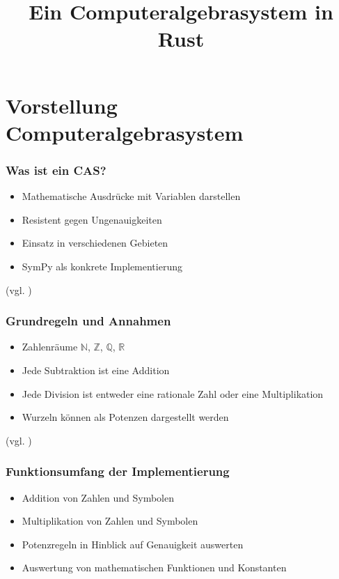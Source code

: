 \documentclass{beamer}
\title{Ein Computeralgebrasystem in Rust}
\begin{document}
\maketitle
{}

\section{Vorstellung Computeralgebrasystem}
\begin{frame}[fragile]
  \frametitle{Was ist ein CAS?}
  \begin{itemize}
    \item Mathematische Ausdrücke mit Variablen darstellen
    \pause
    \item Resistent gegen Ungenauigkeiten
    \pause
    \item Einsatz in verschiedenen Gebieten
    \pause
    \item SymPy als konkrete Implementierung
  \end{itemize}
  {\small (vgl. \cite{FachgruppeDef} \cite[S. 1]{SympyPeerJ})}
\end{frame}

\begin{frame}[fragile]
  \frametitle{Grundregeln und Annahmen}
  \begin{itemize}
    \item Zahlenräume $\mathbb{N}$, $\mathbb{Z}$, $\mathbb{Q}$, $\mathbb{R}$
    \pause
    \item Jede Subtraktion ist eine Addition
    \pause
    \item Jede Division ist entweder eine rationale Zahl oder eine Multiplikation
    \pause
    \item Wurzeln können als Potenzen dargestellt werden
  \end{itemize}
  {\small (vgl. \cite[S. 23 ff.]{Geddes2007} \cite[S. 2]{Tan2000})}
\end{frame}

\begin{frame}[fragile]
  \frametitle{Funktionsumfang der Implementierung}
  \begin{itemize}
    \item Addition von Zahlen und Symbolen
    \pause
    \item Multiplikation von Zahlen und Symbolen
    \pause
    \item Potenzregeln in Hinblick auf Genauigkeit auswerten
    \pause
    \item Auswertung von mathematischen Funktionen und Konstanten
  \end{itemize}
\end{frame}
\end{document}
